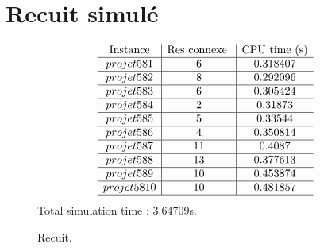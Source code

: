 \documentclass[12pt,a4paper]{article}
\begin{document}
\section{Recuit simulé}

\begin{figure}

\[
\begin{array}{c|c|c}
\text{Instance}  & \text{Res connexe }& \text{CPU time (s)} \\\hline
projet 5 8 1 &6 & 0.318407\\ \hline
projet 5 8 2 &8 & 0.292096\\ \hline
projet 5 8 3 &6 & 0.305424\\ \hline
projet 5 8 4 &2 & 0.31873\\ \hline
projet 5 8 5 &5 & 0.33544\\ \hline
projet 5 8 6 &4 & 0.350814\\ \hline
projet 5 8 7 &11 & 0.4087\\ \hline
projet 5 8 8 &13 & 0.377613\\ \hline
projet 5 8 9 &10 & 0.453874\\ \hline
projet 5 8 10 &10 & 0.481857\\ \hline
\end{array}\]
Total simulation time : 3.64709s.
\caption{Recuit.}
\end{figure}
\end{document}
